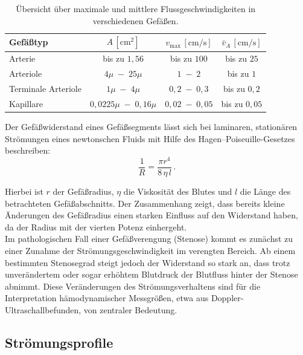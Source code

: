 \documentclass[
	german,%
	accentcolor=3d,%
	type=intern, %
	marginpar=false,%
]{tudapub}
\begin{document}
   \begin{table}[htbp]
      \centering
      \renewcommand{\arraystretch}{1.3}
      \begin{tabular}{lccc}
         Gefäßtyp & $A\,[\mathrm{cm}^2]$ & $v_{\max}\,[\mathrm{cm/s}]$ & $\bar{v}_A\,[\mathrm{cm/s}]$ \\ \hline
         Arterie & bis zu $1,56$ & bis zu $100$ & bis zu $25$ \\
         Arteriole & $4 \mu  \;-\; 25 \mu$ & $1 \;-\; 2$ & bis zu $1$ \\
         Terminale Arteriole & $1 \mu \;-\; 4 \mu$ & $0{,}2 \;-\; 0{,}3$ & bis zu $0{,}2$ \\
         Kapillare & $0{,}0225 \mu \;-\; 0{,}16 \mu$ & $0{,}02 \;-\; 0{,}05$ & bis zu $0{,}05$ \\ \hline
      \end{tabular}
      \caption{Übersicht über maximale und mittlere Flussgeschwindigkeiten in verschiedenen Gefäßen.}\label{tab:flussgeschwindigkeiten}
   \end{table}

   Der Gefäßwiderstand eines Gefäßsegments lässt sich bei laminaren, stationären Strömungen eines newtonschen Fluids mit Hilfe des Hagen--Poiseuille-Gesetzes beschreiben:
   \begin{equation}
      \frac{1}{R} = \frac{\pi r^{4}}{8 \,\eta\, l} \, .
      \label{eq:hagen-poiseuille}
   \end{equation}
   
   Hierbei ist \(r\) der Gefäßradius, \(\eta\) die Viskosität des Blutes und \(l\) die Länge des betrachteten Gefäßabschnitts. Der Zusammenhang zeigt, dass bereits kleine Änderungen des Gefäßradius einen starken Einfluss auf den Widerstand haben, da der Radius mit der vierten Potenz einhergeht.
   \\
   Im pathologischen Fall einer Gefäßverengung (Stenose) kommt es zunächst zu einer Zunahme der Strömungsgeschwindigkeit im verengten Bereich. Ab einem bestimmten Stenosegrad steigt jedoch der Widerstand so stark an, dass trotz unverändertem oder sogar erhöhtem Blutdruck der Blutfluss hinter der Stenose abnimmt. Diese Veränderungen des Strömungsverhaltens sind für die Interpretation hämodynamischer Messgrößen, etwa aus Doppler-Ultraschallbefunden, von zentraler Bedeutung.

\subsection{Strömungsprofile}\label{sec:stroemungsprofile}
\end{document}

